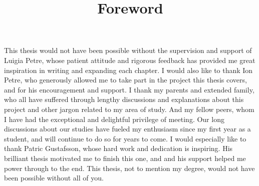 \title{Foreword}

This thesis would not have been possible without the supervision and support of Luigia Petre, whose patient attitude and rigorous feedback has provided me great inspiration in writing and expanding each chapter. I would also like to thank Ion Petre, who generously allowed me to take part in the project this thesis covers, and for his encouragement and support. I thank my parents and extended family, who all have suffered through lengthy discussions and explanations about this project and other jargon related to my area of study. And my fellow peers, whom I have had the exceptional and delightful privilege of meeting. Our long discussions about our studies have fueled my enthusiasm since my first year as a student, and will continue to do so for years to come. I would especially like to thank Patric Gustafsson, whose hard work and dedication is inspiring. His brilliant thesis motivated me to finish this one, and and his support helped me power through to the end. This thesis, not to mention my degree, would not have been possible without all of you.